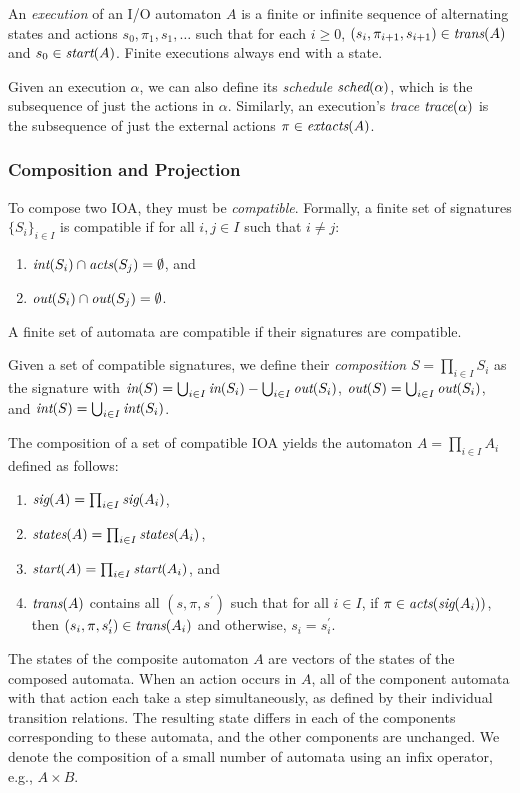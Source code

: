 An \textit{execution} of an I/O automaton $A$ is a finite or infinite
sequence of alternating states and actions $s_0,\pi_1,s_1,\ldots$ such that for
each $i \geq 0$, $(s_i, \pi_{i+1}, s_{i+1}) \in \operatorname*{\textit{trans}}(A)$ and $s_0 \in \operatorname*{\textit{start}}(A)$. Finite executions always end with a state.

Given an execution $\alpha$, we can also define
its \textit{schedule} $\operatorname*{\textit{sched}}(\alpha)$, which is the subsequence of just
the actions in $\alpha$. Similarly, an execution's \textit{trace}
$\operatorname*{\textit{trace}}(\alpha)$ is the subsequence of just the external actions $\pi \in
\operatorname*{\textit{extacts}}(A)$.

\subsubsection{Composition and Projection}
\label{sec:equivalence:preliminaries:composition}

To compose
two IOA, they must be \textit{compatible}. Formally, a finite set of
signatures $\{S_i\}_{i \in I}$ is compatible if for all $i,j \in I$ such that $i \neq j$:
\begin{enumerate}
\item $\operatorname*{\textit{int}}(S_i) \cap \operatorname*{\textit{acts}}(S_j) = \emptyset$, and
\item $\operatorname*{\textit{out}}(S_i) \cap \operatorname*{\textit{out}}(S_j) = \emptyset$.
\end{enumerate}
A finite set of automata are compatible if their signatures are compatible.

Given a set of compatible signatures, we define their \textit{composition} $S =
\prod_{i \in I} S_i$ as the signature with $\operatorname*{\textit{in}}(S) = \bigcup_{i \in I}
\operatorname*{\textit{in}}(S_i) - \bigcup_{i \in I} \operatorname*{\textit{out}}(S_i)$, $\operatorname*{\textit{out}}(S) = \bigcup_{i \in I}
\operatorname*{\textit{out}}(S_i)$, and $\operatorname*{\textit{int}}(S) = \bigcup_{i \in I} \operatorname*{\textit{int}}(S_i)$.

The composition of a set of compatible IOA yields the automaton $A =
\prod_{i \in I} A_i$ defined as follows:
\begin{enumerate}
\item $\operatorname*{\textit{sig}}(A) = \prod_{i \in I} \operatorname*{\textit{sig}}(A_i)$,
\item $\operatorname*{\textit{states}}(A) = \prod_{i \in I} \operatorname*{\textit{states}}(A_i)$,
\item $\operatorname*{\textit{start}}(A) = \prod_{i \in I} \operatorname*{\textit{start}}(A_i)$, and
\item $\operatorname*{\textit{trans}}(A)$ contains all $(s,\pi,s^\prime)$ such that for all $i \in I$, if $\pi \in \operatorname*{\textit{acts}}(\operatorname*{\textit{sig}}(A_i))$, then $(s_i,\pi,s_i^\prime) \in \operatorname*{\textit{trans}}(A_i)$ and otherwise, $s_i = s_i^\prime$.
\end{enumerate}
The states of the composite automaton $A$ are vectors of the states of the composed
automata. When an action occurs in
$A$, all of the component automata with that action each take a step simultaneously, as defined
by their individual transition relations. The resulting state differs in each of
the components corresponding to these automata, and the other components are
unchanged. We denote the composition of a small number of
automata using an infix operator, e.g., $A \times B$.

